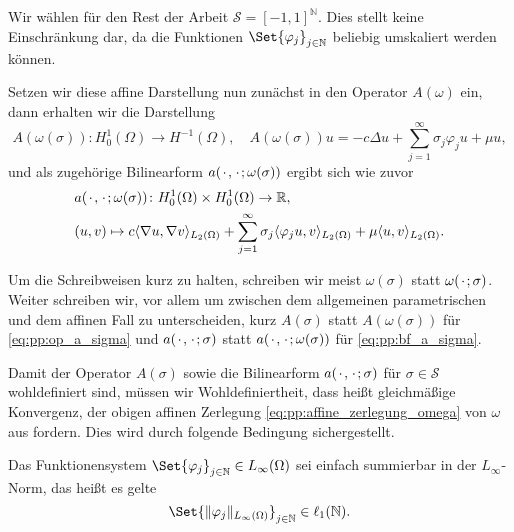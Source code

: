 \begin{Bemerkung}
    Wir wählen für den Rest der Arbeit $\mathcal S = [-1, 1]^{\mathbb{N}}$.
    Dies stellt keine Einschränkung dar, da die Funktionen $\Set{ \varphi_{j} }_{j \in \mathbb{N}}$ beliebig umskaliert werden können.
\end{Bemerkung}

Setzen wir diese affine Darstellung nun zunächst in den Operator $A(\omega)$ ein, dann erhalten wir die Darstellung
\begin{equation}
\label{eq:pp:op_a_sigma}
    A(\omega(\sigma)) \colon H^{1}_{0}(\Omega) \to H^{-1}(\Omega), \quad A(\omega(\sigma)) u = -c \Delta u + \sum_{j = 1}^{\infty} \sigma_{j} \varphi_{j} u + \mu u,
\end{equation}
und als zugehörige Bilinearform $a({\mkern2mu\cdot\mkern2mu}, {\mkern2mu\cdot\mkern2mu}; \omega(\sigma))$ ergibt sich wie zuvor
\begin{equation}
\label{eq:pp:bf_a_sigma}
    \begin{aligned}
    &a({\mkern2mu\cdot\mkern2mu}, {\mkern2mu\cdot\mkern2mu}; \omega(\sigma)) \colon H^{1}_{0}(\Omega) \times H^{1}_{0}(\Omega) \to \mathbb{R}, \\
    &(u, v) \mapsto c\langle\nabla u,\nabla v\rangle_{L_{2}(\Omega)} + \sum_{j = 1}^{\infty} \sigma_{j} \langle\varphi_{j} u,v\rangle_{L_{2}(\Omega)} + \mu \langle u,v\rangle_{L_{2}(\Omega)}.
    \end{aligned}
\end{equation}

\begin{Bemerkung}
    Um die Schreibweisen kurz zu halten, schreiben wir meist $\omega(\sigma)$ statt $\omega({\mkern2mu\cdot\mkern2mu}; \sigma)$.
    Weiter schreiben wir, vor allem um zwischen dem allgemeinen parametrischen und dem affinen Fall zu unterscheiden, kurz $A(\sigma)$ statt $A(\omega(\sigma))$ für \eqref{eq:pp:op_a_sigma} und $a({\mkern2mu\cdot\mkern2mu}, {\mkern2mu\cdot\mkern2mu}; \sigma)$ statt $a({\mkern2mu\cdot\mkern2mu}, {\mkern2mu\cdot\mkern2mu}; \omega(\sigma))$ für \eqref{eq:pp:bf_a_sigma}.
\end{Bemerkung}

Damit der Operator $A(\sigma)$ sowie die Bilinearform $a({\mkern2mu\cdot\mkern2mu}, {\mkern2mu\cdot\mkern2mu}; \sigma)$ für $\sigma \in \mathcal S$ wohldefiniert sind, müssen wir Wohldefiniertheit, dass heißt gleichmäßige Konvergenz, der obigen affinen Zerlegung \eqref{eq:pp:affine_zerlegung_omega} von $\omega$ aus  fordern.
Dies wird durch folgende Bedingung sichergestellt.
\begin{Annahme}
    Das Funktionensystem $\Set{ \varphi_{j} }_{j \in \mathbb{N}} \in L_{\infty}(\Omega)$ sei einfach summierbar in der $L_{\infty}$-Norm, das heißt es gelte
    \begin{equation}
        \Set{ \norm{\varphi_{j}}_{L_{\infty}(\Omega) } }_{j \in \mathbb{N}} \in \ell_{1}(\mathbb{N}).
    \end{equation}
\end{Annahme}

